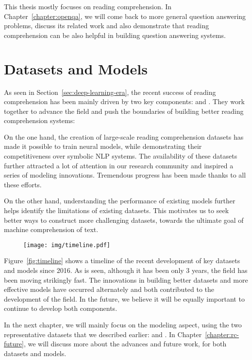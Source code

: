 This thesis mostly focuses on reading comprehension. In Chapter~\ref{chapter:openqa}, we will come back to more general question answering problems, discuss its related work and also demonstrate that reading comprehension can be also helpful in building question answering systems.

\section{Datasets and Models}
\label{sec:rc-drive}


As seen in Section~\ref{sec:deep-learning-era}, the recent success of reading comprehension has been mainly driven by two key components:  and . They work together to advance the field and push the boundaries of building better reading comprehension systems:

\begin{description}
\item
On the one hand, the creation of large-scale reading comprehension datasets has made it possible to train neural models, while demonstrating their competitiveness over symbolic NLP systems. The availability of these datasets further attracted a lot of attention in our research community and inspired a series of modeling innovations. Tremendous progress has been made thanks to all these efforts.
\item
On the other hand, understanding the performance of existing models further helps identify the limitations of existing datasets. This motivates us to seek better ways to construct more challenging datasets, towards the ultimate goal of machine comprehension of text.
\end{description}


\begin{figure}[!t]
    \center
    \texttt{[image: img/timeline.pdf]}
\end{figure}

Figure~\ref{fig:timeline} shows a timeline of the recent development of key datasets and models since 2016. As is seen, although it has been only 3 years, the field has been moving strikingly fast. The innovations in building better datasets and more effective models have occurred alternately and both contributed to the development of the field. In the future, we believe it will be equally important to continue to develop both components.

In the next chapter, we will mainly focus on the modeling aspect, using the two representative datasets that we described earlier:  and . In Chapter~\ref{chapter:rc-future}, we will discuss more about the advances and future work, for both datasets and models.
